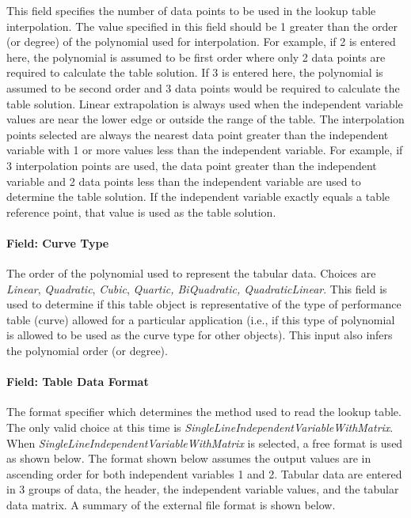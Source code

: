 This field specifies the number of data points to be used in the lookup table interpolation. The value specified in this field should be 1 greater than the order (or degree) of the polynomial used for interpolation. For example, if 2 is entered here, the polynomial is assumed to be first order where only 2 data points are required to calculate the table solution. If 3 is entered here, the polynomial is assumed to be second order and 3 data points would be required to calculate the table solution. Linear extrapolation is always used when the independent variable values are near the lower edge or outside the range of the table. The interpolation points selected are always the nearest data point greater than the independent variable with 1 or more values less than the independent variable. For example, if 3 interpolation points are used, the data point greater than the independent variable and 2 data points less than the independent variable are used to determine the table solution. If the independent variable exactly equals a table reference point, that value is used as the table solution.

\paragraph{Field: Curve Type}\label{field-curve-type-2}

The order of the polynomial used to represent the tabular data. Choices are \emph{Linear}, \emph{Quadratic}, \emph{Cubic}, \emph{Quartic, BiQuadratic, QuadraticLinear}. This field is used to determine if this table object is representative of the type of performance table (curve) allowed for a particular application (i.e., if this type of polynomial is allowed to be used as the curve type for other objects). This input also infers the polynomial order (or degree).


\paragraph{Field: Table Data Format}\label{field-table-data-format}

The format specifier which determines the method used to read the lookup table. The only valid choice at this time is \emph{SingleLineIndependentVariableWithMatrix}. When \emph{SingleLineIndependentVariableWithMatrix} is selected, a free format is used as shown below. The format shown below assumes the output values are in ascending order for both independent variables 1 and 2. Tabular data are entered in 3 groups of data, the header, the independent variable values, and the tabular data matrix. A summary of the external file format is shown below.

